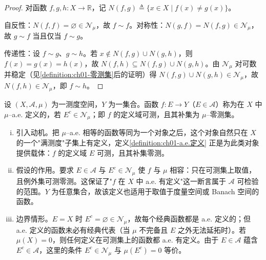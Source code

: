 \documentclass[../../main.tex]{subfiles}%
\begin{document}
\begin{proof}
对函数 $f,g,h:X\to\mathbb{R}$，记 $N(f,g)\triangleq\{x\in X\mid f(x)\neq g(x)\}$。

自反性：$N(f,f)=\varnothing\in\mathcal{N}_\mu$，故 $f\sim f$。对称性：$N(g,f)=N(f,g)\in\mathcal{N}_\mu$，故 $g\sim f$ 当且仅当 $f\sim g$。

传递性：设 $f\sim g$、$g\sim h$。若 $x\notin N(f,g)\cup N(g,h)$，则 $f(x)=g(x)=h(x)$，故 $N(f,h)\subseteq N(f,g)\cup N(g,h)$。由 $\mathcal{N}_\mu$ 对可数并稳定（见\cref{definition:ch01-零测集}后的证明）得 $N(f,g)\cup N(g,h)\in\mathcal{N}_\mu$，故 $N(f,h)\in\mathcal{N}_\mu$，即 $f\sim h$。
\end{proof}

\begin{definition}\label{definition:ch01-a.e.定义}
设 $(X,\mathcal{A},\mu)$ 为一测度空间，$Y$ 为一集合。函数 $f:E\to Y$（$E\in\mathcal{A}$）称为在 $X$ 中 $\mu$--a.e. 定义的，若 $E^c\in\mathcal{N}_\mu$；即 $f$ 的定义域可测，且其补集为 $\mu$--零测集。
\end{definition}

\begin{remark}\label{remark:ch01-a.e.定义动机}
\begin{enumerate}[(i)]
\item 引入动机。把 $\mu$--a.e. 相等的函数等同为一个对象之后，这个对象自然只在 $X$ 的一个"满测度"子集上有定义，定义\cref{definition:ch01-a.e.定义} 正是为此类对象提供载体：$f$ 的定义域 $E$ 可测，且其补集零测。
\item 假设的作用。要求 $E\in\mathcal{A}$ 与 $E^c\in\mathcal{N}_\mu$ 使 $f$ 与 $\mu$ 相容：只在可测集上取值，且例外集可测零测。这保证了"$f$ 在 $X$ 中 a.e. 有定义"这一断言属于 $\mathcal{A}$ 可检验的范围。$Y$ 为任意集合，故该定义也适用于取值于度量空间或 Banach 空间的函数。
\item 边界情形。$E=X$ 时 $E^c=\varnothing\in\mathcal{N}_\mu$，故每个经典函数都是 a.e. 定义的；但 a.e. 定义的函数未必有经典代表（当 $\mu$ 不完备且 $E$ 之外无法延拓时）。若 $\mu(X)=0$，则任何定义在可测集上的函数都 a.e. 有定义。由于 $E\in\mathcal{A}$ 蕴含 $E^c\in\mathcal{A}$，这里的条件 $E^c\in\mathcal{N}_\mu$ 与 $\mu(E^c)=0$ 等价。
\end{enumerate}
\end{remark}
\end{document}
